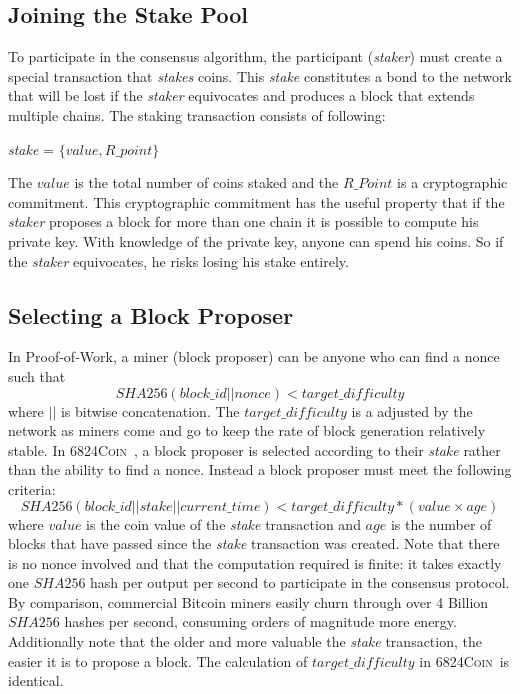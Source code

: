 \documentclass{article}
\newcommand{\coin}{ \textsc{6824Coin}\ }
\begin{document}
\subsection{Joining the Stake Pool}

To participate in the consensus algorithm, the participant (\textit{staker}) must create a special transaction that \textit{stakes} coins. This \textit{stake} constitutes a bond to the network that will be lost if the \textit{staker} equivocates and produces a block that extends multiple chains. The staking transaction consists of following:
\begin{center}
\textit{stake} = $\{value, R\_point\}$
\end{center}
The $value$ is the total number of coins staked and the $R\_Point$ is a cryptographic commitment. This cryptographic commitment has the useful property that if the \textit{staker} proposes a block for more than one chain it is possible to compute his private key. With knowledge of the private key, anyone can spend his coins. So if the \textit{staker} equivocates, he risks losing his stake entirely.

\subsection{Selecting a Block Proposer}
In Proof-of-Work, a miner (block proposer) can be anyone who can find a nonce such that 
$$SHA256(block\_id || nonce) < target\_difficulty$$
where $||$ is bitwise concatenation. The $target\_difficulty$ is a adjusted by the network as miners come and go to keep the rate of block generation relatively stable. 
In \coin, a block proposer is selected according to their \textit{stake} rather than the ability to find a nonce. Instead a block proposer must meet the following criteria:  
$$SHA256(block\_id || stake || current\_time) < target\_difficulty * (value \times age) $$ 
where $value$ is the coin value of the \textit{stake} transaction and $age$ is the number of blocks that have passed since the \textit{stake} transaction was created. Note that there is no nonce involved and that the computation required is finite: it takes exactly one $SHA256$ hash per output per second to participate in the consensus protocol. By comparison, commercial Bitcoin miners easily churn through over 4 Billion $SHA256$ hashes per second, consuming orders of magnitude more energy. Additionally note that the older and more valuable the \textit{stake} transaction, the easier it is to propose a block. The calculation of $target\_difficulty$ in \coin is identical. 
\end{document}
